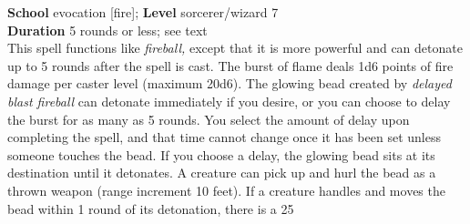 \textbf{School} evocation [fire]; \textbf{Level} sorcerer/wizard 7\\
\textbf{Duration} 5 rounds or less; see text\\
This spell functions like \textit{fireball, }except that it is more powerful and can detonate up to 5 rounds after the spell is cast. The burst of flame deals 1d6 points of fire damage per caster level (maximum 20d6). The glowing bead created by \textit{delayed blast fireball }can detonate immediately if you desire, or you can choose to delay the burst for as many as 5 rounds. You select the amount of delay upon completing the spell, and that time cannot change once it has been set unless someone touches the bead. If you choose a delay, the glowing bead sits at its destination until it detonates. A creature can pick up and hurl the bead as a thrown weapon (range increment 10 feet). If a creature handles and moves the bead within 1 round of its detonation, there is a 25%
